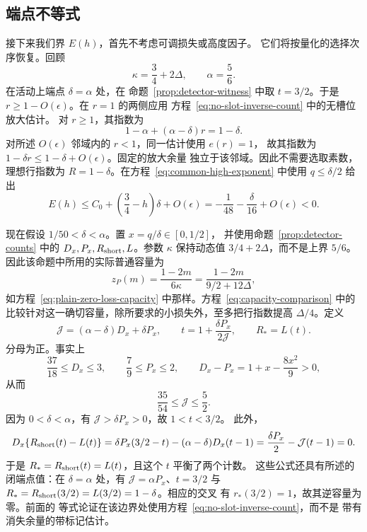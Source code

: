 \documentclass[11pt,a4paper]{article}
\numberwithin{equation}{section}
\numberwithin{figure}{section}
\theoremstyle{definition}
\theoremstyle{remark}
\begin{document}
\subsection{端点不等式}\label{sec:adaptive-endpoint}

接下来我们界 \(E(h)\)，首先不考虑可调损失或高度因子。
它们将按量化的选择次序恢复。回顾
\[
 \kappa=\frac34+2\Delta,\qquad \alpha=\frac56.
\]
在活动上端点 \(\delta=\alpha\) 处，在
命题~\ref{prop:detector-witness} 中取 \(t=3/2\)。于是
\(r\ge1-O(\epsilon)\)。在 \(r=1\) 的两侧应用
方程~\eqref{eq:no-slot-inverse-count} 中的无槽位放大估计。
对 \(r\ge1\)，其指数为
\[
 1-\alpha+(\alpha-\delta)r=1-\delta.
\]
对所述 \(O(\epsilon)\) 邻域内的 \(r<1\)，同一估计使用 \(e(r)=1\)，
故其指数为 \(1-\delta r\le1-\delta+O(\epsilon)\)。固定的放大余量
独立于该邻域。因此不需要选取素数，理想行指数为
\(R=1-\delta\)。在方程~\eqref{eq:common-high-exponent} 中使用
\(q\le\delta/2\) 给出
\begin{equation}
 E(h)\le C_0+\left(\frac34-h\right)\delta+O(\epsilon)
       =-\frac1{48}-\frac{\delta}{16}+O(\epsilon)<0.
 \label{eq:large-delta-endpoint}
\end{equation}

现在假设 \(1/50<\delta<\alpha\)。置 \(x=q/\delta\in[0,1/2]\)，
并使用命题~\ref{prop:detector-counts} 中的
\(D_x,P_x,R_{\rm short},L\)。参数 \(\kappa\)
保持动态值 \(3/4+2\Delta\)，而不是上界
\(5/6\)。因此该命题中所用的实际普通容量为
\[
 z_P(m)=\frac{1-2m}{6\kappa}
       =\frac{1-2m}{9/2+12\Delta},
\]
如方程~\eqref{eq:plain-zero-loss-capacity} 中那样。方程~\eqref{eq:capacity-comparison}
中的比较针对这一确切容量，除所要求的小损失外，至多把行指数提高
\(\Delta/4\)。定义
\begin{equation}
 \mathcal J=(\alpha-\delta)D_x+\delta P_x,\qquad
 t=1+\frac{\delta P_x}{2\mathcal J},\qquad
 R_*=L(t).
 \label{eq:target-cutoff}
\end{equation}
分母为正。事实上
\[
 \frac{37}{18}\le D_x\le3,\qquad
 \frac79\le P_x\le2,\qquad
 D_x-P_x=1+x-\frac{8x^2}{9}>0,
\]
从而
\[
 \frac{35}{54}\le\mathcal J\le\frac52.
\]
因为 \(0<\delta<\alpha\)，有
\(\mathcal J>\delta P_x>0\)，故 \(1<t<3/2\)。
此外，
\[
 D_x\{R_{\rm short}(t)-L(t)\}
 =\delta P_x(3/2-t)-(\alpha-\delta)D_x(t-1)
 =\frac{\delta P_x}{2}-\mathcal J(t-1)=0.
\]
于是 \(R_*=R_{\rm short}(t)=L(t)\)，且这个 \(t\) 平衡了两个计数。
这些公式还具有所述的闭端点值：在
\(\delta=\alpha\) 处，有 \(\mathcal J=\alpha P_x\)、\(t=3/2\) 与
\(R_*=R_{\rm short}(3/2)=L(3/2)=1-\delta\)。相应的交叉
有 \(r_*(3/2)=1\)，故其逆容量为零。前面的
等式论证在该边界处使用方程~\eqref{eq:no-slot-inverse-count}，而不是
带有消失余量的带标记估计。
\end{document}
